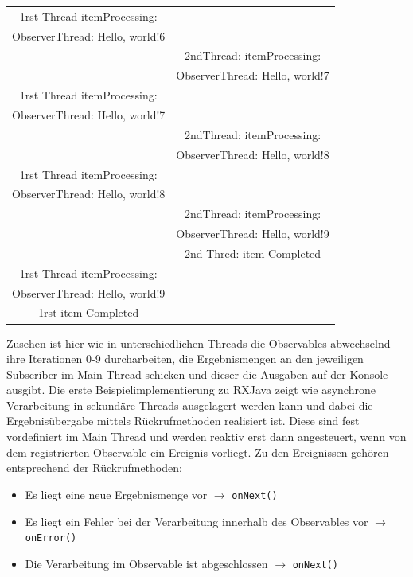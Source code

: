 \documentclass[12pt,oneside,a4paper,bibtotoc,liststotoc]{scrreprt}
\begin{document}
\begin{table}[h!]
\begin{center}
\begin{tabular}{cc}
1rst Thread itemProcessing:&  \\
ObserverThread: Hello, world!6&  \\
                               		& 2ndThread: itemProcessing:\\
                               		& ObserverThread: Hello, world!7\\
1rst Thread itemProcessing:&  \\
ObserverThread: Hello, world!7&  \\
                               		& 2ndThread: itemProcessing:\\
                               		& ObserverThread: Hello, world!8\\
1rst Thread itemProcessing:&  \\
ObserverThread: Hello, world!8&  \\
                               		& 2ndThread: itemProcessing:\\
                               		& ObserverThread: Hello, world!9\\
                               		& 2nd Thred: item Completed\\
1rst Thread itemProcessing:&  \\
ObserverThread: Hello, world!9&  \\
1rst item Completed&  \\
\bottomrule
    \end{tabular}
  \end{center}
\end{table}
\newpage
Zusehen ist hier wie in unterschiedlichen Threads die Observables abwechselnd ihre Iterationen 0-9 durcharbeiten, die Ergebnismengen an den jeweiligen Subscriber im Main Thread schicken und dieser die Ausgaben auf der Konsole ausgibt.  
Die erste Beispielimplementierung zu RXJava zeigt wie asynchrone Verarbeitung in sekundäre Threads ausgelagert werden kann und dabei die Ergebnisübergabe mittels Rückrufmethoden realisiert ist. Diese sind fest vordefiniert im Main Thread und werden reaktiv erst dann angesteuert, wenn von dem registrierten Observable ein Ereignis vorliegt. Zu den Ereignissen gehören entsprechend der Rückrufmethoden:
\begin{itemize}
\item Es liegt eine neue Ergebnismenge vor $\rightarrow$ \texttt{onNext()}
\item Es liegt ein Fehler bei der Verarbeitung innerhalb des Observables vor $\rightarrow$ \texttt{onError()}
\item Die Verarbeitung im Observable ist abgeschlossen $\rightarrow$ \texttt{onNext()}
\end{itemize}
\end{document}
